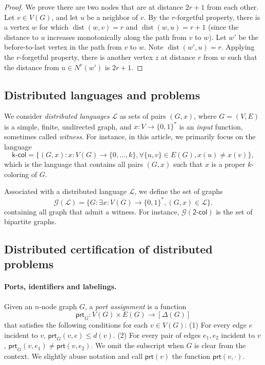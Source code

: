 \documentclass[11pt]{article}
\DeclareMathOperator{\dist}{dist}
\newcommand*{\ports}{\mathsf{prt}}
\begin{document}
\begin{proof}
  We prove there are two nodes that are at distance $2r+1$ from each other.
  Let $v \in V(G)$, and let $u$ be a neighbor of $v$.
  By the $r$-forgetful property, there is a vertex $w$ for which $\dist(w,v) =
  r$ and $\dist(w,u) = r+1$ (since the distance to $u$ increases monotonically
  along the path from $v$ to $w$).
  Let $w'$ be the before-to-last vertex in the path from $v$ to $w$.
  Note $\dist(w',u) = r$.
  Applying the $r$-forgetful property, there is another vertex $z$ at distance
  $r$ from $w$ such that the distance from $u \in N^r(w')$ is $2r+1$.
\end{proof}

\subsection{Distributed languages and problems}


We consider \emph{distributed languages} \(\mathcal{L}\) as sets of pairs \((G,
x)\), where \(G = (V, E)\) is a simple, finite, undirected graph, and \(x\colon
V \rightarrow \{0, 1\}^*\) is an \emph{input} function, sometimes called
\emph{witness}. 
For instance, in this article, we primarily focus on the language 
\[
\textsf{k-col} = \{ (G, x) : x\colon V(G) \rightarrow \{0, \dots, k\}, \forall
\{u, v\} \in E(G), x(u) \neq x(v)\},
\]
which is the language that contains all pairs \((G, x)\) such that \(x\) is a proper \(k\)-coloring of \(G\).

Associated with a distributed language \(\mathcal{L}\), we define the set of graphs 
\[
\mathcal{G}(\mathcal{L}) = \{G : \exists x\colon V(G) \rightarrow \{0,1\}^*, (G,
x) \in \mathcal{L}\}.
\]
containing all graph that admit a witness. For instance, \(\mathcal{G}(\textsf{2-col})\) is the set of bipartite graphs. 

\subsection{Distributed certification of distributed problems}

\paragraph{Ports, identifiers and labelings.} Given an $n$-node graph $G$, a
\emph{port assignment} is a function 
\[\ports_G\colon V(G) \times E(G) \to [\Delta(G)]\] 
that satisfies the following conditions for each $v \in V(G)$: (1)
For every edge $e$ incident to $v$, $\ports_G(v, e) \leq d(v)$. (2) For every pair
of edges $e_1, e_2$ incident to $v$, $\ports_G(v, e_1) \neq \ports(v, e_2)$. 
We omit the subscript when $G$ is clear from the context.
We slightly abuse notation and call $\ports(v)$ the function $\ports(v,\cdot)$.
\end{document}

